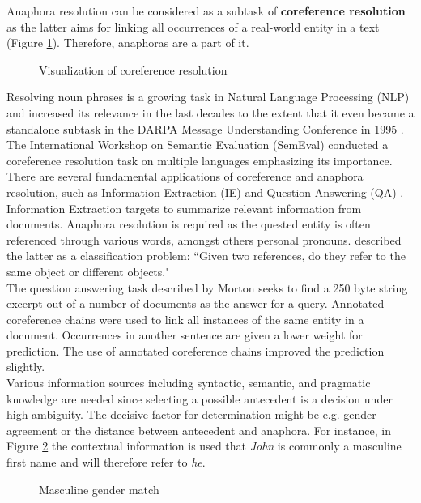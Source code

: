 Anaphora resolution can be considered as a subtask of \textbf{coreference resolution} as the latter aims for linking all occurrences of a real-world entity in a text (Figure \ref{figure:visofcoref}). Therefore, anaphoras are a part of it. 

\begin{figure}[h]
	\centering\sffamily
		\caption{Visualization of coreference resolution}
	\label{figure:visofcoref}
\end{figure}

Resolving noun phrases is a growing task in Natural Language Processing (NLP) and increased its relevance in the last decades to the extent that it even became a standalone subtask in the DARPA Message Understanding Conference in 1995 \citep{chinchor1995message}. The International Workshop on Semantic Evaluation (SemEval) conducted a coreference resolution task on multiple languages \citep{recasens2010semeval} emphasizing its importance. 
There are several fundamental applications of coreference and anaphora resolution, such as Information Extraction (IE) \citep{mccarthy1995using} and Question Answering (QA) \citep{morton2000coreference}.\\ 
Information Extraction targets to summarize relevant information from documents. Anaphora resolution is required as the quested entity is often referenced through various words, amongst others personal pronouns. \cite{mccarthy1995using} described the latter as a classification problem: “Given two references, do they refer to the same object or different objects."\\
The question answering task described by Morton seeks to find a 250 byte string excerpt out of a number of documents as the answer for a query. Annotated coreference chains were used to link all instances of the same entity in a document. Occurrences in another sentence are given a lower weight for prediction. The use of annotated coreference chains improved the prediction slightly.\\
Various information sources including syntactic, semantic, and pragmatic knowledge are needed since selecting a possible antecedent is a decision under high ambiguity. The decisive factor for determination might be e.g. gender agreement or the distance between antecedent and anaphora. For instance, in Figure \ref{figure:mascmatch} the contextual information is used that \textit{John} is commonly a masculine first name and will therefore refer to \textit{he}.
\begin{figure}[h]
\centering\sffamily
\caption{Masculine gender match}
	\label{figure:mascmatch}
\end{figure}

